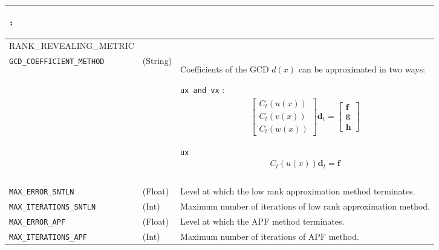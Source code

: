 \documentclass{article}
\begin{document}
\begin{longtable}[c]{|p{14em}||p{5em}|p{25em}|}
\begin{description}
			\item[\texttt{Arithmetic Mean} : ]  
		\end{description} 
	
	
	\\
	
	\hline
		RANK\_REVEALING\_METRIC
	&	
	&
	\\
	
	

		\hline
		\texttt{GCD\_COEFFICIENT\_METHOD}
	&	(String)
	&	Coefficients of the GCD $d(x)$ can be approximated in two ways:
		\begin{description}
			\item \texttt{ux and vx} : 
				\begin{align}
					\left[
						\begin{array}{c}
							C_{t}(u(x))
							\\
							C_{t}(v(x))
							\\
							C_{t}(w(x))
						\end{array}
					\right]
					\textbf{d}_{t}
					=
					\left[
						\begin{array}{c}
							\textbf{f}
							\\
							\textbf{g}
							\\
							\textbf{h}
						\end{array}
					\right]
				\end{align}
			\item \texttt{ux}
				\begin{align}
					C_{t}(u(x))
					\textbf{d}_{t}
					=
					\textbf{f}
				\end{align}
				
		\end{description}
	\\
	
	
	
	
	\hline
	&	
	&
	
	\\
	
	
	
	
	
	
		\hline
		\texttt{MAX\_ERROR\_SNTLN}
	&	(Float)
	&	Level at which the low rank approximation method terminates.
	\\
		\hline
		\texttt{MAX\_ITERATIONS\_SNTLN} 
	&	(Int)
	&	Maximum number of iterations of low rank approximation method.
	\\
		\hline
		\texttt{MAX\_ERROR\_APF} 
	&	(Float)
	&	Level at which the APF method terminates.
	\\	
		\hline
		\texttt{MAX\_ITERATIONS\_APF}
	&	(Int) 
	&	Maximum number of iterations of APF method.
	\\	
	\hline
\end{longtable}




%
\end{document}
